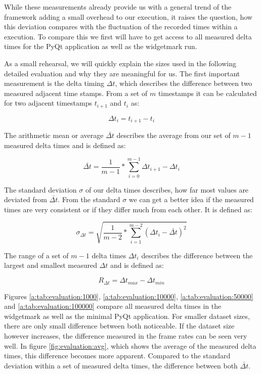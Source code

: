 While these measurements already provide us with a general trend of the
framework adding a small overhead to our execution, it raises the question, how
this deviation compares with the fluctuation of the recorded times within a
execution. To compare this we first will have to get access to all measured
delta times for the PyQt application as well as the widgetmark run.

As a small rehearsal, we will quickly explain the sizes used in the following
detailed evaluation and why they are meaningful for us. The first important
measurement is the delta timing $\Delta t$, which describes the difference
between two measured adjacent time stamps. From a set of $m$ timestamps it can
be calculated for two adjacent timestamps $t_{i+1}$ and $t_i$ as:

$$\Delta t_{i} = t_{i+1} - t_{i}$$

The arithmetic mean or average $\bar{\Delta t}$ describes the average from our
set of $m-1$ measured delta times and is defined as:

$$\bar{\Delta t} = \frac{1}{m-1} * \sum_{i=0}^{m-1} {\Delta t_{i+1} - \Delta t_{i}}$$

The standard deviation $\sigma$ of our delta times describes, how far most
values are deviated from $\bar{\Delta t}$. From the standard $\sigma$ we can get
a better idea if the measured times are very consistent or if they differ much
from each other. It is defined as:

$$ \sigma_{\Delta t} = \sqrt{\frac{1}{m-2} * \sum_{i=1}^{m-2} (\Delta t_{i} - \bar{\Delta t})^2} $$

The range of a set of $m-1$ delta times $\Delta t_i$ describes the difference
between the largest and smallest measured $\Delta t$ and is defined as:

$$R_{\Delta t} = \Delta t_{max} - \Delta t_{min}$$

Figures \ref{a:tab:evaluation:1000}, \ref{a:tab:evaluation:10000},
\ref{a:tab:evaluation:50000} and \ref{a:tab:evaluation:100000} compare all
measured delta times in the widgetmark as well as the minimal PyQt application.
For smaller dataset sizes, there are only small difference between both
noticeable. If the dataset size however increases, the difference measured in
the frame rates can be seen very well. In figure \ref{fig:evaluation:avg}, which
shows the average of the measured delta times, this difference becomes more
apparent. Compared to the standard deviation within a set of measured delta
times, the difference between both $\bar{\Delta t}$.


